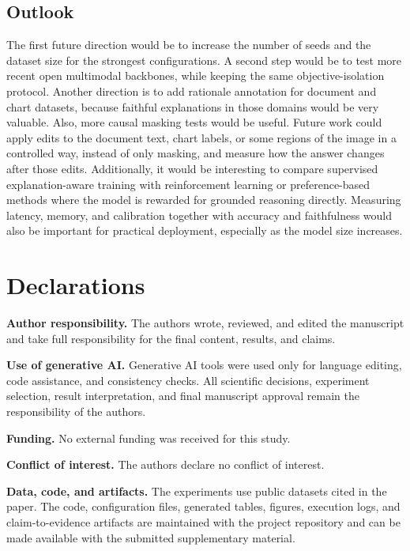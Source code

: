 \documentclass[12pt,bibliography=totoc,listof=totoc,BCOR=5mm,DIV=12,oneside,open=any]{scrbook}
\begin{document}
\section{Outlook}
The first future direction would be to increase the number of seeds and the dataset size for the strongest configurations.
A second step would be to test more recent open multimodal backbones, while keeping the same objective-isolation protocol.
Another direction is to add rationale annotation for document and chart datasets, because faithful explanations in those domains would be very valuable.
Also, more causal masking tests would be useful.
Future work could apply edits to the document text, chart labels, or some regions of the image in a controlled way, instead of only masking, and measure how the answer changes after those edits.
Additionally, it would be interesting to compare supervised explanation-aware training with reinforcement learning or preference-based methods where the model is rewarded for grounded reasoning directly.
Measuring latency, memory, and calibration together with accuracy and faithfulness would also be important for practical deployment, especially as the model size increases.

\backmatter %
    \chapter*{Declarations}
\textbf{Author responsibility.}
The authors wrote, reviewed, and edited the manuscript and take full responsibility for the final content, results, and claims.

\textbf{Use of generative AI.}
Generative AI tools were used only for language editing, code assistance, and consistency checks.
All scientific decisions, experiment selection, result interpretation, and final manuscript approval remain the responsibility of the authors.

\textbf{Funding.}
No external funding was received for this study.

\textbf{Conflict of interest.}
The authors declare no conflict of interest.

\textbf{Data, code, and artifacts.}
The experiments use public datasets cited in the paper.
The code, configuration files, generated tables, figures, execution logs, and claim-to-evidence artifacts are maintained with the project repository and can be made available with the submitted supplementary material.
\end{document}

